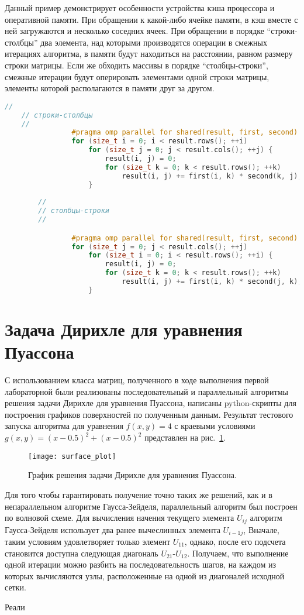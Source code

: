\documentclass{article}
\begin{document}
	Данный пример демонстрирует особенности устройства кэша процессора и оперативной памяти. При обращении к какой-либо ячейке памяти, в кэш вместе с ней загружаются и несколько соседних ячеек. При обращении в порядке ``строки-столбцы'' два элемента, над которыми производятся операции в смежных итерациях алгоритма, в памяти будут находиться на расстоянии, равном размеру строки матрицы. Если же обходить массивы в порядке ``столбцы-строки'', смежные итерации будут оперировать элементами одной строки матрицы, элементы которой располагаются в памяти друг за другом.
	
	\begin{lstlisting}[language=C++, caption={Два способа обхода матрицы}, label={lst:matrixLookup}, texcl=true]
	//
	// строки-столбцы
	//
				#pragma omp parallel for shared(result, first, second)
				for (size_t i = 0; i < result.rows(); ++i) 
					for (size_t j = 0; j < result.cols(); ++j) {
						result(i, j) = 0;
						for (size_t k = 0; k < result.rows(); ++k) 
							result(i, j) += first(i, k) * second(k, j);
					}
					
		//
		// столбцы-строки
		//

				#pragma omp parallel for shared(result, first, second)
				for (size_t j = 0; j < result.cols(); ++j) 
					for (size_t i = 0; i < result.rows(); ++i) {
						result(i, j) = 0;
						for (size_t k = 0; k < result.rows(); ++k) 
							result(i, j) += first(i, k) * second(j, k);
					}

	\end{lstlisting}
	\section{Задача Дирихле для уравнения Пуассона}\label{sec:lab2}

	С использованием класса матриц, полученного в ходе выполнения первой лабораторной были реализованы последовательный и параллельный алгоритмы решения задачи Дирихле для уравнения Пуассона, написаны python-скрипты для построения графиков поверхностей по полученным данным.
	Результат тестового запуска алгоритма для уравнения $f(x,y) = 4$ с краевыми условиями $g(x,y) =(x - 0.5)^2 + (x - 0.5)^2$ представлен на рис.~\ref{fig:surfPlot}.
	\begin{figure}[h]
		\centering
		\texttt{[image: surface\_plot]}
		\caption{График решения задачи Дирихле для уравнения Пуассона.}
		\label{fig:surfPlot} 
	\end{figure}

	Для того чтобы гарантировать получение точно таких же решений, как и в непараллельном алгоритме Гаусса-Зейделя, параллельный алгоритм был построен по волновой схеме. Для вычисления начения текущего элемента $U_{i j}$ алгоритм Гаусса-Зейделя использует два ранее вычеслинных элемента $U_{i-1 j}$, Вначале, таким условиям удовлетворяет только элемент $U_{1 1}$, однако, после его подсчета становится доступна следующая диагональ $U_{2 1}$-$U_{1 2}$. Получаем,	что выполнение одной итерации можно разбить на последовательность шагов, на каждом из которых вычисляются узлы, расположенные на одной из диагоналей исходной сетки. 
	
	Реали
\end{document}
